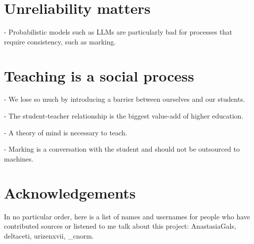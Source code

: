 \documentclass[12pt]{article}
\begin{document}
\section{Unreliability matters}
- Probabilistic models such as LLMs are particularly bad for processes that require consistency, such as marking.

\section{Teaching is a social process}
- We lose so much by introducing a barrier between ourselves and our students.

- The student-teacher relationship is the biggest value-add of higher education.

- A theory of mind is necessary to teach.

- Marking is a conversation with the student and should not be outsourced to machines.

\newpage
\section{Acknowledgements}
In no particular order, here is a list of names and usernames for people who have contributed sources or listened to me talk about this project: AnastasiaGals, deltaceti, urizenxvii, \_cnorm.

\newpage


\end{document}
